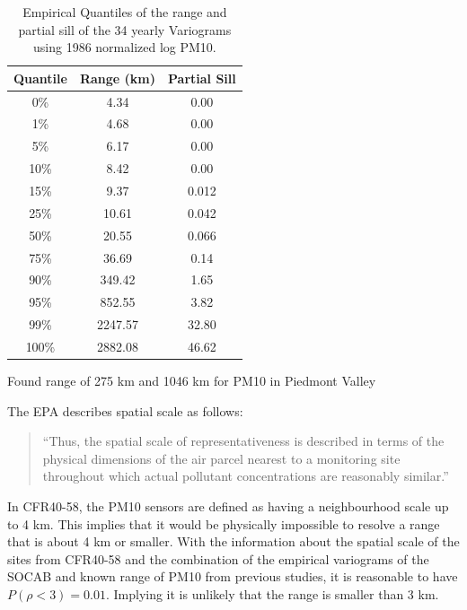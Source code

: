\begin{table}[ht]
	\centering
	\begin{tabular}{c||c|c}
		Quantile & Range (km) & Partial Sill \\
		\hline
		0\% & 4.34 & 0.00 \\
		1\% & 4.68 & 0.00 \\
		5\% & 6.17 & 0.00 \\
		10\% & 8.42 & 0.00 \\
		15\% & 9.37 & 0.012 \\
		25\% & 10.61 & 0.042 \\
		50\% & 20.55 & 0.066 \\
		75\% & 36.69 & 0.14 \\
		90\% & 349.42 & 1.65 \\
		95\% & 852.55 & 3.82 \\
		99\% & 2247.57 & 32.80 \\
		100\% & 2882.08 & 46.62 \\
		
	\end{tabular}
	\caption{Empirical Quantiles of the range and partial sill of the 34 yearly Variograms using 1986 normalized log PM10. }
	\label{tab:Empirical_Range_Sill_Quantile}
\end{table}

\cite{cameletti2011spatio} Found range of 275 km and 1046 km for PM10 in Piedmont Valley

The \ac{EPA} describes spatial scale as follows:
\begin{quote}
	``Thus, the spatial scale of representativeness is described in terms of the physical dimensions of the air parcel nearest to a monitoring site throughout which actual pollutant concentrations are reasonably similar.''   \end{quote}
In CFR40-58, the \ac{PM10} sensors are defined as having a neighbourhood scale up to 4 km.  This implies that it would be physically impossible to resolve a range that is about 4 km or smaller.  With the information about the spatial scale of the sites from CFR40-58 and the combination of the empirical variograms of the \ac{SOCAB} and known range of \ac{PM10} from previous studies, it is reasonable to have $P(\rho < 3) = 0.01$. Implying it is unlikely that the range is smaller than 3 km.



